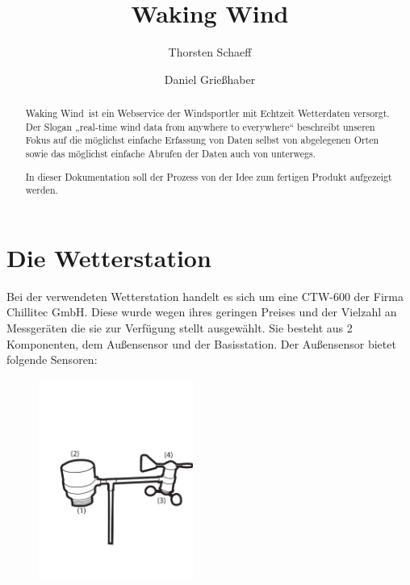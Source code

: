 \documentclass{report}
\begin{document}
\title{Waking Wind}
\author{Thorsten Schaeff \and Daniel Grie\ss haber}
\maketitle
\tableofcontents

\renewcommand\bibname{Referenzen}

\printbibliography


\begin{abstract}
\glqq Waking Wind\grqq ~ist ein Webservice der Windsportler mit Echtzeit Wetterdaten versorgt.
Der Slogan „real-time wind data from anywhere to everywhere“ beschreibt unseren Fokus auf die möglichst einfache Erfassung von Daten selbst von abgelegenen Orten sowie das möglichst einfache Abrufen der Daten auch von unterwegs.

In dieser Dokumentation soll der Prozess von der Idee zum fertigen Produkt aufgezeigt werden.
\end{abstract}

\section{Die Wetterstation}
Bei der verwendeten Wetterstation handelt es sich um eine CTW-600 der Firma Chillitec GmbH\cite{CTW-600}. Diese wurde wegen ihres geringen Preises und der Vielzahl an Messgeräten die sie zur Verfügung stellt ausgewählt. Sie besteht aus 2 Komponenten, dem Außensensor und der Basisstation. Der Außensensor bietet folgende Sensoren:
\begin{figure}
    \begin{center}
        \includegraphics[width=0.45\textwidth]{Bilder/Wetterstation.pdf}
    \end{center}
    \vspace{-50pt}
\end{figure}
\end{document}
